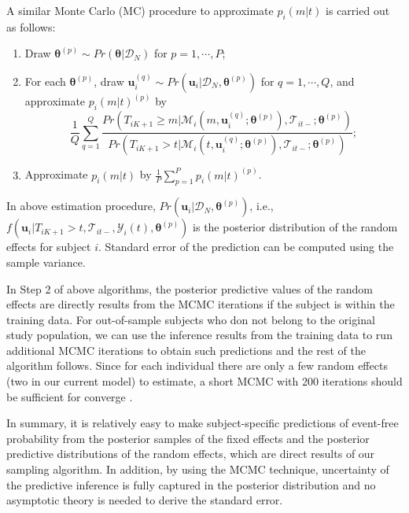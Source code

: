 A similar Monte Carlo (MC) procedure to approximate $p_i(m|t)$ is carried out as follows:
\begin{enumerate}
\item Draw $\boldsymbol{\theta}^{(p)}\sim Pr(\boldsymbol{\theta}|\mathcal{D}_N)$ for $p=1, \cdots, P$;
\item For each $\boldsymbol{\theta}^{(p)}$, draw $\boldsymbol{u}_i^{(q)} \sim Pr(\boldsymbol{u}_i|\mathcal{D}_N, \boldsymbol{\theta}^{(p)})$ for $q=1, \cdots, Q$, and approximate $p_i(m|t)^{(p)}$ by
\[\frac{1}{Q}\sum_{q=1}^Q\frac{Pr(T_{iK+1}\ge m | \mathcal{M}_{i}(m, \boldsymbol{u}_i^{(q)}; \boldsymbol{\theta}^{(p)}), \mathcal{T}_{it-}; \boldsymbol{\theta}^{(p)})}{Pr(T_{iK+1}> t | \mathcal{M}_{i}(t, \boldsymbol{u}_i^{(q)}; \boldsymbol{\theta}^{(p)}), \mathcal{T}_{it-}; \boldsymbol{\theta}^{(p)})};\]
\item Approximate $p_i(m|t)$ by $\frac{1}{P} \sum_{p=1}^{P} p_i(m|t)^{(p)}$.
\end{enumerate}

\noindent In above estimation procedure, $Pr(\boldsymbol{u}_i|\mathcal{D}_N, \boldsymbol{\theta}^{(p)})$, i.e., $f({\boldsymbol u}_i|T_{iK+1}> t, \mathcal{T}_{it-}, \mathcal{Y}_{i}(t), \boldsymbol{\theta}^{(p)})$ is the posterior distribution of the random effects for subject $i$. Standard error of the prediction can be computed using the sample variance.

In Step 2 of above algorithms, the posterior predictive values of the random effects are directly results from the MCMC iterations if the subject is within the training data. For out-of-sample subjects who don not belong to the original study population, we can use the inference results from the training data to run additional MCMC iterations to obtain such predictions and the rest of the algorithm follows. Since for each individual there are only a few random effects (two in our current model) to estimate, a short MCMC with 200 iterations should be sufficient for converge \citep{taylor2013real}.


In summary, it is relatively easy to make subject-specific predictions of event-free probability from the posterior samples of the fixed effects and the posterior predictive distributions of the random effects, which are direct results of our sampling algorithm. In addition, by using the MCMC technique, uncertainty of the predictive inference is fully captured in the posterior distribution and no asymptotic theory is needed to derive the standard error.

